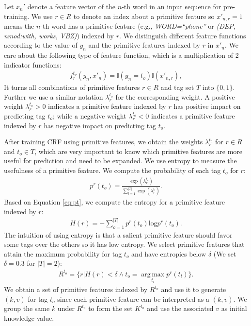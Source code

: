 Let $x_n'$ denote a feature vector of the $n$-th word in an input sequence for pre-training. We use $r \in R$ to denote an index about a primitive feature so $x'_{n,r}=1$ means the $n$-th word has a primitive feature (e.g., \textit{WORD=``phone''} or \textit{(DEP, nmod:with, works, VBZ)}) indexed by $r$. We distinguish different feature functions according to the value of $y_n$ and the primitive features indexed by $r$ in $x'_n$. We care about the following type of feature function, which is a multiplication of 2 indicator functions: 
\begin{equation} \label{eq:m}
\begin{split}
f_r^{t_o}(y_{n}, x'_n)=\mathbb{I}(y_{n} = t_o)\mathbb{I}(x'_{n,r} ) ,
\end{split}
\end{equation}
It turns all combinations of primitive features $r \in R$ and tag set $T$ into $\{0, 1\}$. Further we use a similar notation $\lambda_r^{t_o}$ for the corresponding weight. A positive weight $\lambda_r^{t_o}>0$ indicates a primitive feature indexed by $r$ has positive impact on predicting tag $t_o$; while a negative weight $\lambda_r^{t_o}<0$ indicates a primitive feature indexed by $r$ has negative impact on predicting tag $t_o$.

After training CRF using primitive features, we obtain the weights $\lambda_{r}^{t_o}$ for $r \in R$ and $t_o \in T$, which are very important to know which primitive features are more useful for prediction and need to be expanded. We use entropy to measure the usefulness of a primitive feature. We compute the probability of each tag $t_o$ for $r$:
\begin{equation} \label{eq:pt}
\begin{split}
p^r(t_o)=\frac{\exp(\lambda_r^{t_o})}{\sum_{l=1}^{\left\vert{T}\right\vert}\exp(\lambda_r^{t_l})} .
\end{split}
\end{equation}
Based on Equation \ref{eq:pt}, we compute the entropy for a primitive feature indexed by $r$:
\begin{equation} \label{eq:ent}
\begin{split}
H(r)=-\sum_{o=1}^{\left\vert{T}\right\vert} p^r(t_o)\text{log}p^r(t_o) .
\end{split}
\end{equation}
The intuition of using entropy is that a salient primitive feature should favor some tags over the others so it has low entropy. 
We select primitive features that attain the maximum probability for tag $t_o$ and have entropies below $\delta$ (We set $\delta=0.3$ for $\left\vert{T}\right\vert=2$): 
\begin{equation} \label{eq:rto}
\begin{split}
R^{t_o}=\{r|H(r)<\delta \wedge t_o=\operatorname*{arg\,max}_{t_l}p^r(t_l)\}.
\end{split}
\end{equation}
We obtain a set of primitive features indexed by $R^{t_o}$ and use it to generate $(k, v)$ for tag $t_o$ since each primitive feature can be interpreted as a $(k, v)$. We group the same $k$ under $R^{t_o}$ to form the set $K^{t_o}$ and use the associated $v$ as initial knowledge value.

